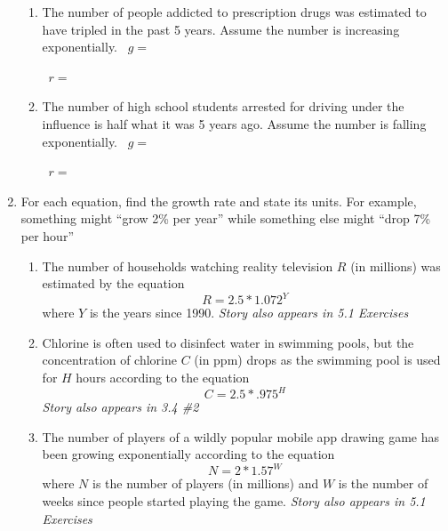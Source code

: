 \begin{enumerate}
\begin{enumerate}
\item The number of people addicted to prescription drugs was estimated to have tripled in the past 5 years.  Assume the number is increasing exponentially.  \vfill
~\hfill $g=$ \hspace{1in} 

~\hfill $r=$ \hspace{1in} 
\vfill

\item The number of high school students arrested for driving under the influence is half what it was 5 years ago.  Assume the number is falling exponentially.  \vfill
~\hfill $g=$ \hspace{1in} 

~\hfill $r=$ \hspace{1in} 
\vfill

\end{enumerate}

\newpage %

\item For each equation, find the growth rate and state its units. For example, something might ``grow 2\% per year'' while something else might ``drop 7\% per hour''  %

\begin{enumerate} 

\item The number of households watching reality television $R$ (in millions) was estimated by the equation $$R=2.5 \ast 1.072^Y$$ where $Y$ is the years since 1990. 
\hfill \emph{Story also appears in 5.1 Exercises} \vfill

\item Chlorine is often used to disinfect water in swimming pools, but  the concentration of chlorine $C$ (in ppm) drops as the swimming pool is used for $H$ hours according to the equation $$C = 2.5 \ast .975^H$$ 
 \hfill  \emph{Story also appears in 3.4 \#2} \vfill
 
 \item The number of players of a wildly popular mobile app drawing game  has been growing exponentially according to the equation $$N = 2 \ast 1.57^W$$ where $N$ is the number of players (in millions) and $W$ is the number of weeks since people started playing the game.
 \hfill \emph{Story also appears in 5.1 Exercises} \vfill
 
\end{enumerate}

\end{enumerate}


